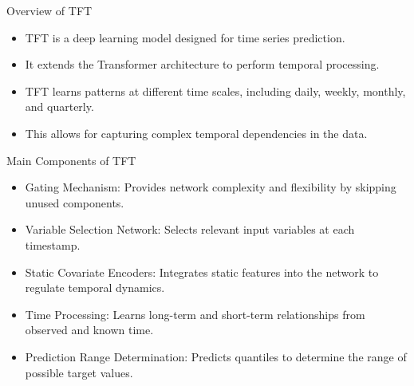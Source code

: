 
\begin{frame}{Overview of TFT}

	
	\begin{itemize}
		\item TFT is a deep learning model designed for time series prediction.
		\item It extends the Transformer architecture to perform temporal processing.
		\item TFT learns patterns at different time scales, including daily, weekly, monthly, and quarterly.
		\item This allows for capturing complex temporal dependencies in the data.
	\end{itemize}
	
\end{frame}


\begin{frame}{Main Components of TFT}
		\begin{itemize}
		\item Gating Mechanism: Provides network complexity and flexibility by skipping unused components.
		\item Variable Selection Network: Selects relevant input variables at each timestamp.\newpage
		\item Static Covariate Encoders: Integrates static features into the network to regulate temporal dynamics.
		\item Time Processing: Learns long-term and short-term relationships from observed and known time.
		\item Prediction Range Determination: Predicts quantiles to determine the range of possible target values.
		\end{itemize}
	
\end{frame}

